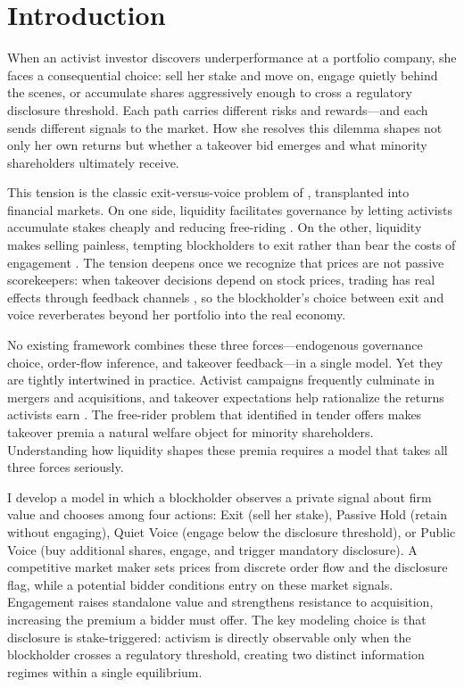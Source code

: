 \section{Introduction}

When an activist investor discovers underperformance at a portfolio company, she faces a consequential choice: sell her stake and move on, engage quietly behind the scenes, or accumulate shares aggressively enough to cross a regulatory disclosure threshold. Each path carries different risks and rewards---and each sends different signals to the market. How she resolves this dilemma shapes not only her own returns but whether a takeover bid emerges and what minority shareholders ultimately receive.

This tension is the classic exit-versus-voice problem of \citet{Hirschman1970}, transplanted into financial markets. On one side, liquidity facilitates governance by letting activists accumulate stakes cheaply and reducing free-riding \citep{Maug1998}. On the other, liquidity makes selling painless, tempting blockholders to exit rather than bear the costs of engagement \citep{Coffee1991,Bhide1993}. The tension deepens once we recognize that prices are not passive scorekeepers: when takeover decisions depend on stock prices, trading has real effects through feedback channels \citep{BondEdmansGoldstein2012,EdmansGoldsteinJiang2012}, so the blockholder's choice between exit and voice reverberates beyond her portfolio into the real economy.

No existing framework combines these three forces---endogenous governance choice, order-flow inference, and takeover feedback---in a single model. Yet they are tightly intertwined in practice. Activist campaigns frequently culminate in mergers and acquisitions, and takeover expectations help rationalize the returns activists earn \citep{BravJiangPartnoyThomas2008,GreenwoodSchor2009}. The free-rider problem that \citet{GrossmanHart1980} identified in tender offers makes takeover premia a natural welfare object for minority shareholders. Understanding how liquidity shapes these premia requires a model that takes all three forces seriously.

I develop a model in which a blockholder observes a private signal about firm value and chooses among four actions: Exit (sell her stake), Passive Hold (retain without engaging), Quiet Voice (engage below the disclosure threshold), or Public Voice (buy additional shares, engage, and trigger mandatory disclosure). A competitive market maker sets prices from discrete order flow and the disclosure flag, while a potential bidder conditions entry on these market signals. Engagement raises standalone value and strengthens resistance to acquisition, increasing the premium a bidder must offer. The key modeling choice is that disclosure is stake-triggered: activism is directly observable only when the blockholder crosses a regulatory threshold, creating two distinct information regimes within a single equilibrium.

